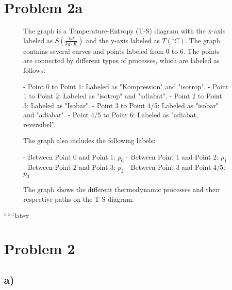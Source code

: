 \section*{Problem 2a}

\begin{figure}[h]
    \centering
    The graph is a Temperature-Entropy (T-S) diagram with the x-axis labeled as $S \left( \frac{kJ}{kg \cdot K} \right)$ and the y-axis labeled as $T \left( ^\circ C \right)$. The graph contains several curves and points labeled from 0 to 6. The points are connected by different types of processes, which are labeled as follows:
    
    - Point 0 to Point 1: Labeled as "Kompression" and "isotrop".
    - Point 1 to Point 2: Labeled as "isotrop" and "adiabat".
    - Point 2 to Point 3: Labeled as "Isobar".
    - Point 3 to Point 4/5: Labeled as "isobar" and "adiabat".
    - Point 4/5 to Point 6: Labeled as "adiabat, reversibel".
    
    The graph also includes the following labels:
    
    - Between Point 0 and Point 1: $p_0$
    - Between Point 1 and Point 2: $p_1$
    - Between Point 2 and Point 3: $p_2$
    - Between Point 3 and Point 4/5: $p_3$
    
    The graph shows the different thermodynamic processes and their respective paths on the T-S diagram.

\end{figure}

``````latex


\section*{Problem 2}



\subsection*{a)}

